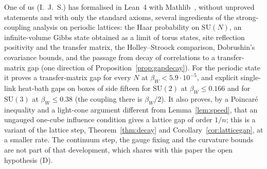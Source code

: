 \documentclass[11pt]{amsart}
\theoremstyle{definition}
\theoremstyle{remark}
\numberwithin{equation}{section}
\newcommand{\SU}{\mathrm{SU}}
\begin{document}
One of us (I.~J.~S.) has formalised in Lean~4 with Mathlib~\cite{Ses26}, without
unproved statements and with only the standard axioms, several ingredients of
the strong-coupling analysis on periodic lattices: the Haar probability on
$\SU(N)$, an infinite-volume Gibbs state obtained as a limit of torus states,
site reflection positivity and the transfer matrix, the Holley--Stroock
comparison, Dobrushin's covariance bounds, and the passage from decay of
correlations to a transfer-matrix gap (one direction of
Proposition~\ref{prop:gapdecay}). For the periodic state it proves a
transfer-matrix gap for every $N$ at $\beta_W<5.9\cdot10^{-5}$, and explicit
single-link heat-bath gaps on boxes of side fifteen for $\SU(2)$ at
$\beta_W\le0.166$ and for $\SU(3)$ at $\beta_W\le0.38$ (the coupling there is
$\beta_W/2$). It also proves, by a Poincar\'e inequality and a light-cone
argument different from Lemma~\ref{lem:speed}, that an ungauged one-cube
influence condition gives a lattice gap of order $1/n$; this is a variant of
the lattice step, Theorem~\ref{thm:decay} and Corollary~\ref{cor:latticegap},
at a smaller rate. The continuum step, the gauge
fixing and the curvature bounds are not part of that development, which shares
with this paper the open hypothesis (D).
\end{document}
